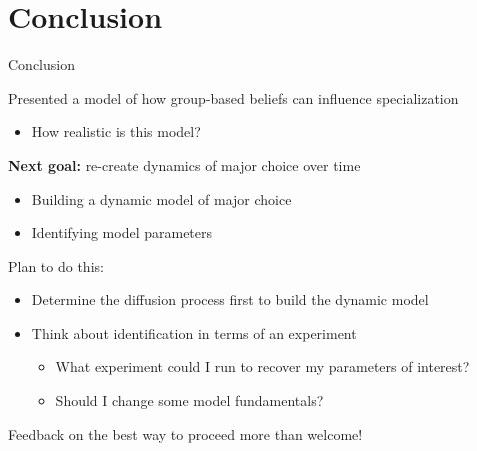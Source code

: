 \documentclass[compress, 8pt]{beamer}
\begin{document}


\miniframesoff
\section[Conclusion]{Conclusion}
\begin{frame}
    \tableofcontents[currentsection]
\end{frame}
\miniframeson

\begin{frame}{Conclusion}

Presented a model of how group-based beliefs can influence specialization
\begin{itemize}
    \item How realistic is this model?
\end{itemize}

\vspace{3ex}
\textbf{Next goal:} re-create dynamics of major choice over time
\begin{itemize}
    \item Building a dynamic model of major choice
    \item Identifying model parameters
\end{itemize}

\vspace{3ex}
Plan to do this:
\begin{itemize}
    \item Determine the diffusion process first to build the dynamic model 
    \item Think about identification in terms of an experiment
    \begin{itemize}
         \item What experiment could I run to recover my parameters of interest?
         \item Should I change some model fundamentals?
     \end{itemize} 
\end{itemize}
Feedback on the best way to proceed more than welcome!
\end{frame}
\end{document}
